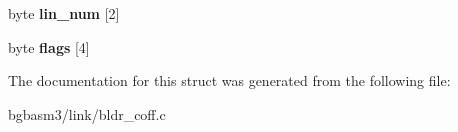 \begin{DoxyCompactItemize}
\item 
\hypertarget{structblnk__coff__sec__s_a6119f49cbf4b28c40ccc43d16dbadc7e}{byte {\bfseries lin\-\_\-num} \mbox{[}2\mbox{]}}\label{structblnk__coff__sec__s_a6119f49cbf4b28c40ccc43d16dbadc7e}

\item 
\hypertarget{structblnk__coff__sec__s_a386db63a4e1dafc4ebc01b4b597c2610}{byte {\bfseries flags} \mbox{[}4\mbox{]}}\label{structblnk__coff__sec__s_a386db63a4e1dafc4ebc01b4b597c2610}

\end{DoxyCompactItemize}


The documentation for this struct was generated from the following file\-:\begin{DoxyCompactItemize}
\item 
bgbasm3/link/bldr\-\_\-coff.\-c\end{DoxyCompactItemize}

